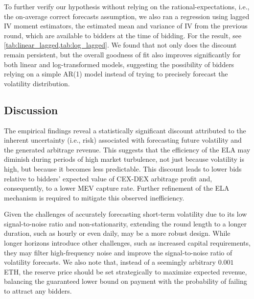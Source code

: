 To further verify our hypothesis without relying on the rational-expectations, i.e., the on-average correct forecasts assumption, we also ran a regression using lagged IV moment estimators, the estimated mean and variance of IV from the previous round, which are available to bidders at the time of bidding. For the result, see \cref{tab:linear_lagged,tab:log_lagged}. We found that not only does the discount remain persistent, but the overall goodness of fit also improves significantly for both linear and log-transformed models, suggesting the possibility of bidders relying on a simple AR(1) model instead of trying to precisely forecast the volatility distribution.

\subsection{Discussion}
The empirical findings reveal a statistically significant discount attributed to the inherent uncertainty (i.e., risk) associated with forecasting future volatility and the generated arbitrage revenue. 
This suggests that the efficiency of the ELA may diminish during periods of high market turbulence, not just because volatility is high, but because it becomes less predictable. This discount leads to lower bids relative to bidders' expected value of CEX-DEX arbitrage profit and, consequently, to a lower MEV capture rate. Further refinement of the ELA mechanism is required to mitigate this observed inefficiency. 

Given the challenges of accurately forecasting short-term volatility due to its low signal-to-noise ratio and non-stationarity, extending the round length to a longer duration, such as hourly or even daily, may be a more robust design. While longer horizons introduce other challenges, such as increased capital requirements, they may filter high-frequency noise and improve the signal-to-noise ratio of volatility forecasts. We also note that, instead of a seemingly arbitrary $0.001$ ETH, the reserve price should be set strategically to maximize expected revenue, balancing the guaranteed lower bound on payment with the probability of failing to attract any bidders.

